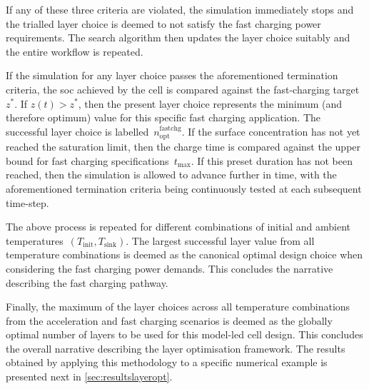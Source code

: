 If any  of these three criteria  are violated, the simulation  immediately stops
and the trialled layer  choice is deemed to not satisfy  the fast charging power
requirements. The  search algorithm then  updates the layer choice  suitably and
the entire workflow is repeated.

If the  simulation for  any layer choice  passes the  aforementioned termination
criteria,  the  \gls{soc}   achieved  by  the  cell  is   compared  against  the
fast-charging   target~$z^\ast$.  If   $z(t)   >  z^\ast$,   then  the   present
layer  choice  represents   the  minimum  (and  therefore   optimum)  value  for
this  specific  fast  charging  application.  The  successful  layer  choice  is
labelled~$n_\text{opt}^\text{fastchg}$. If the surface concentration has not yet
reached the saturation limit, then the charge time is compared against the upper
bound for  fast charging specifications~$t_\text{max}$. If  this preset duration
has not been reached, then the simulation is allowed to advance further in time,
with the aforementioned  termination criteria being continuously  tested at each
subsequent time-step.

The above process is repeated for  different combinations of initial and ambient
temperatures~\mbox{$(T_\text{init},  T_\text{sink})$}.  The  largest  successful
layer value from all temperature combinations is deemed as the canonical optimal
design choice when  considering the fast charging power  demands. This concludes
the  narrative describing  the  fast charging  pathway.

Finally, the  maximum of the  layer choices across all  temperature combinations
from the  acceleration and  fast charging  scenarios is  deemed as  the globally
optimal  number of  layers  to be  used  for this  model-led  cell design.  This
concludes the overall narrative describing the layer optimisation framework. The
results obtained by applying this methodology to a specific numerical example is
presented next in \cref{sec:resultslayeropt}.



